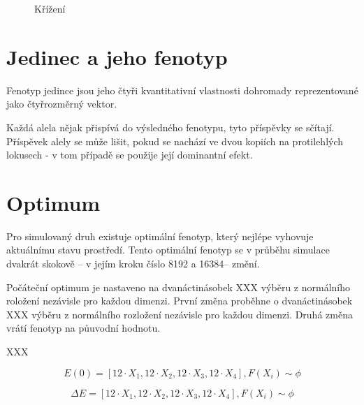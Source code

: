 \begin{figure}

  \caption{Křížení}
\end{figure}



\section{Jedinec a jeho fenotyp}

Fenotyp jedince jsou jeho čtyři kvantitativní vlastnosti dohromady reprezentované jako čtyřrozměrný vektor.

Každá alela nějak přispívá do výsledného fenotypu, tyto příspěvky se sčítají. Příspěvek alely se může lišit, pokud se
nachází ve dvou kopiích na protilehlých lokusech - v tom případě se použije její dominantní efekt.


\section{Optimum}

Pro simulovaný druh existuje optimální fenotyp, který nejlépe vyhovuje aktuálnímu stavu prostředí.
Tento optimální fenotyp se v průběhu simulace dvakrát skokově -- v jejím kroku číslo 8192 a 16384-- změní.

Počáteční optimum je nastaveno na dvanáctinásobek XXX výběru z normálního roložení nezávisle pro každou dimenzi.
První změna proběhne o dvanáctinásobek XXX  výběru z normálního rozložení nezávisle pro každou dimenzi. Druhá změna
vrátí fenotyp na půuvodní hodnotu.

XXX

\begin{equation}
E(0) =  [12{\cdot}X_1, 12{\cdot}X_2, 12{\cdot}X_3, 12{\cdot}X_4], F(X_i) \sim \phi
\end{equation}

\begin{equation}
\Delta{E} = [12{\cdot}X_1, 12{\cdot}X_2, 12{\cdot}X_3, 12{\cdot}X_4], F(X_i) \sim \phi
\end{equation}


